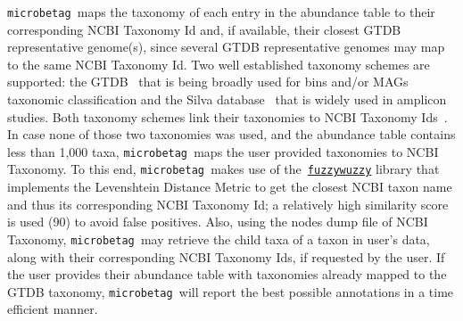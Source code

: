 \documentclass[sn-mathphys,Numbered]{sn-jnl}  %
\theoremstyle{thmstyleone}%
\theoremstyle{thmstyletwo}%
\theoremstyle{thmstylethree}%
\newcommand{\microbetag}{\texttt{microbetag }}
\begin{document}
        \microbetag maps the taxonomy of each entry in the abundance table to their corresponding NCBI Taxonomy Id and, if available, their closest GTDB representative genome(s), since several GTDB representative genomes may map to the same NCBI Taxonomy Id.
        Two well established taxonomy schemes are supported: the GTDB~\cite{parks2022gtdb} that is being broadly used for bins and/or MAGs taxonomic classification and the Silva database~\cite{quast2012silva} that is widely used in amplicon studies. Both taxonomy schemes link their taxonomies to NCBI Taxonomy Ids~\cite{schoch2020ncbi}.
        In case none of those two taxonomies was used, and the abundance table contains less than 1,000 taxa, \microbetag maps the user provided taxonomies to NCBI Taxonomy. 
        To this end, \microbetag makes use of the~\href{https://github.com/seatgeek/thefuzz}{\texttt{fuzzywuzzy}} library that implements the Levenshtein Distance Metric to get the closest NCBI taxon name and thus its corresponding NCBI Taxonomy Id; a relatively high similarity score is used (90) to avoid false positives. 
        Also, using the nodes dump file of NCBI Taxonomy, \microbetag may retrieve the child taxa of a taxon in user's data, along with their corresponding NCBI Taxonomy Ids, if requested by the user.
        If the user provides their abundance table with taxonomies already mapped to the GTDB taxonomy, \microbetag will report the best possible annotations in a time efficient manner. 
        
        
        
\end{document}
